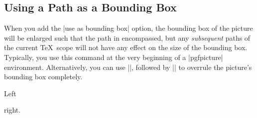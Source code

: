 \subsection{Using a Path as a Bounding Box}
\label{section-using-bb}

When you add the |use as bounding box| option, the bounding box of the
picture will be enlarged such that the path in encompassed, but any
\emph{subsequent} paths of the current \TeX\ scope will not have any
effect on the size of the bounding box. Typically, you use this
command at the very beginning of a |{pgfpicture}| environment. Alternatively, you can use |\pgfresetboundingbox|, followed by || to overrule the picture's bounding box completely.

\begin{codeexample}[]
Left
\begin{pgfpicture}
  \pgfpathrectangle{\pgfpointorigin}{\pgfpoint{2ex}{1ex}}

  \pgfpathcircle{\pgfpointorigin}{2ex}
\end{pgfpicture}
right.
\end{codeexample}

